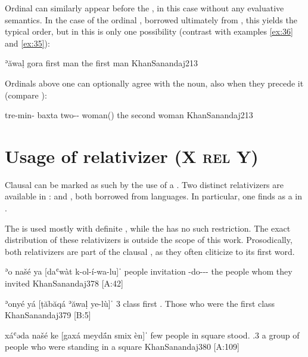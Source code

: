 
Ordinal \secns can similarly appear before the \prim, in this case without any {evaluative} semantics. In the case of the ordinal , borrowed ultimately from \Arab, this yields the typical  order, but in \JSan this is only one possibility (contrast with  examples \vref{ex:36} and \vref{ex:35}):

{ʾăwaḷ gora}
{first man}
{the first man}
{KhanSanandaj}{213}

Ordinals above one can optionally agree with the \prim noun, also when they precede it (compare ):

{tre-min- baxta}
{two-\ord-\opt\fem{} woman(\fem)}
{the second woman}
{KhanSanandaj}{213}

\section{Usage of relativizer (X \textsc{rel} Y)} \label{ss:JSan_rel}

Clausal \secns can be marked as such by the use of a \rel*.  Two distinct relativizers are available in \JSan:  and , both borrowed from  languages. In particular, one finds  as a \rel* in  \citep[136]{BalayEsmaili}. 

The   is used mostly with definite \prims, while the   has no such restriction. The exact distribution of these relativizers is outside the scope of this work. Prosodically, both relativizers are part of the clausal \secn, as they often cliticize to its first word.

{ʾo\cb{} našé ya\cb{} [daʿwàt k-ol-í-wa-lu]ˈ}
{\cb{} people \rel\cb{} invitation \ind-do-\agent\pl-\pst-\pl}
{the people whom they invited}
{KhanSanandaj}{378 {[A:42]}}

{ʾonyé yá [ṭăbăqá ʾăwaḷ \cb{}ye-lù]ˈ}
{3\pl{} \rel{} class first \cb{}\cop.\pl{}}
{Those who were the first class}
{KhanSanandaj}{379 {[B:5]}}

{xá\cb{}ʿəda našé ke\cb{} [ga\cb{}xá meydā́n smix \cb{}èn]ˈ}
{\indef\cb{}few people \rel\cb{} in\cb{}\indef{} square stood.\resl{} \cb{}\cop.3\pl}
{a group of people who were standing in a square}
{KhanSanandaj}{380 {[A:109]}}


